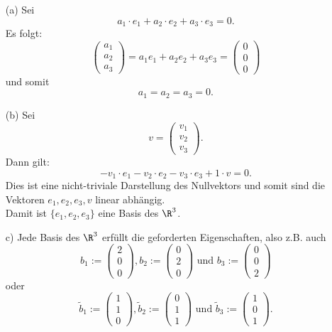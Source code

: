 \begin{itemize}
	\item[(a)]
		Sei
		$$
			a_1\cdot e_1 + a_2\cdot e_2 + a_3\cdot e_3 = 0.
		$$
		Es folgt:
		$$
			\begin{pmatrix}
				a_1\\
				a_2\\
				a_3
			\end{pmatrix}
			=
			a_1e_1 + a_2e_2 + a_3e_3 
			=
			\begin{pmatrix}
				0\\
				0\\
				0
			\end{pmatrix}
		$$
		und somit 
		$$
			a_1=a_2=a_3=0.
		$$
	\item[(b)]
		Sei
		$$
			v =
			\begin{pmatrix}
				v_1\\
				v_2\\
				v_3
			\end{pmatrix}.
		$$
		Dann gilt:
		$$
			-v_1\cdot e_1 -v_2\cdot e_2 - v_3\cdot e_3 + 1\cdot v = 0.
		$$
		Dies ist eine nicht-triviale Darstellung des Nullvektors und somit sind die Vektoren $e_1, e_2, e_3, v$ linear abh\"angig.\\
		


Damit ist $\{e_1, e_2, e_3\}$ eine Basis des $\R^3$.


\item[c)] Jede Basis des $\R^3$ erfüllt die geforderten Eigenschaften, also z.B. auch 
$$
	b_1 :=
	\begin{pmatrix}
		2\\
		0\\
		0	
	\end{pmatrix},
		b_2 :=
	\begin{pmatrix}
		0\\
		2\\
		0	
	\end{pmatrix} \text{ und }
		b_3 :=
	\begin{pmatrix}
		0\\
		0\\
		2	
	\end{pmatrix}
$$
oder
$$
	\tilde b_1 :=
	\begin{pmatrix}
		1\\
		1\\
		0	
	\end{pmatrix},
		\tilde b_2 :=
	\begin{pmatrix}
		0\\
		1\\
		1	
	\end{pmatrix} \text{ und }
		\tilde b_3 :=
	\begin{pmatrix}
		1\\
		0\\
		1	
	\end{pmatrix}.
$$
\end{itemize}

